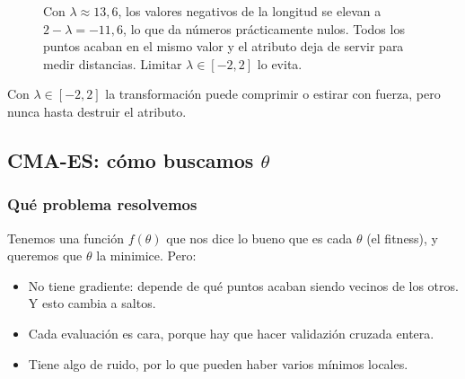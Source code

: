 \begin{figure}[htbp]
\centering
{}
\caption{Con $\lambda \approx 13{,}6$, los valores negativos de la longitud se
elevan a $2-\lambda=-11{,}6$, lo que da números prácticamente nulos. Todos los
puntos acaban en el mismo valor y el atributo deja de servir para medir
distancias. Limitar $\lambda\in[-2,2]$ lo evita.}
\label{fig:colapso}
\end{figure}

Con $\lambda\in[-2,2]$ la transformación puede comprimir o estirar con fuerza, pero nunca hasta destruir el atributo.

\subsection{CMA-ES: cómo buscamos $\theta$}
\subsubsection{Qué problema resolvemos}

Tenemos una función $f(\theta)$ que nos dice lo bueno que es cada $\theta$ (el fitness), y queremos que $\theta$ la minimice. Pero: 
\begin{itemize}
    \item No tiene gradiente: depende de qué puntos acaban siendo vecinos de los otros. Y esto cambia a saltos. 
    \item Cada evaluación es cara, porque hay que hacer validazión cruzada entera. 
    \item Tiene algo de ruido, por lo que pueden haber varios mínimos locales.
\end{itemize}

